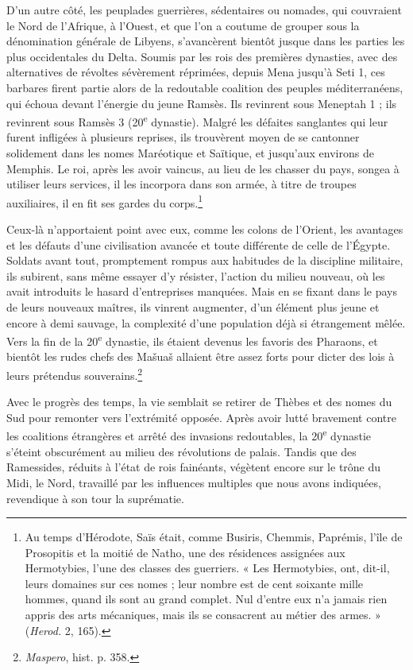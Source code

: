 \documentclass[a4paper, 11pt, oneside]{article}
\begin{document}
D'un autre côté, les peuplades guerrières, sédentaires ou nomades, qui couvraient le Nord de l'Afrique, à l'Ouest, et que l'on a coutume de grouper sous la dénomination générale de Libyens, s'avancèrent bientôt jusque dans les parties les plus occidentales du Delta. Soumis par les rois des premières dynasties, avec des alternatives de révoltes sévèrement réprimées, depuis Mena jusqu'à Seti 1, ces barbares firent partie alors de la redoutable coalition des peuples méditerranéens, qui échoua devant l'énergie du jeune Ramsès. Ils revinrent sous Meneptah 1 ; ils revinrent sous Ramsès 3 (20\textsuperscript{e} dynastie). Malgré les défaites sanglantes qui leur furent infligées à plusieurs reprises, ils trouvèrent moyen de se cantonner solidement dans les nomes Maréotique et Saïtique, et jusqu'aux environs de Memphis. Le roi, après les avoir vaincus, au lieu de les chasser du pays, songea à utiliser leurs services, il les incorpora dans son armée, à titre de troupes auxiliaires, il en fit ses gardes du corps.\footnote{Au temps d'Hérodote, Saïs était, comme Busiris, Chemmis, Paprémis, l'île de Prosopitis et la moitié de Natho, une des résidences assignées aux Hermotybies, l'une des classes des guerriers. « Les Hermotybies, ont, dit-il, leurs domaines sur ces nomes ; leur nombre est de cent soixante mille hommes, quand ils sont au grand complet. Nul d'entre eux n'a jamais rien appris des arts mécaniques, mais ils se consacrent au métier des armes. » (\emph{Herod.} 2, 165).}

Ceux-là n'apportaient point avec eux, comme les colons de l'Orient, les avantages et les défauts d'une civilisation avancée et toute différente de celle de l'Égypte. Soldats avant tout, promptement rompus aux habitudes de la discipline militaire, ils subirent, sans même essayer d'y résister, l'action du milieu nouveau, où les avait introduits le hasard d'entreprises manquées. Mais en se fixant dans le pays de leurs nouveaux maîtres, ils vinrent augmenter, d'un élément plus jeune et encore à demi sauvage, la complexité d'une population déjà si étrangement mêlée. Vers la fin de la 20\textsuperscript{e} dynastie, ils étaient devenus les favoris des Pharaons, et bientôt les rudes chefs des Mašuaš allaient être assez forts pour dicter des lois à leurs prétendus souverains.\footnote{\emph{Maspero}, hist. p. 358.}

Avec le progrès des temps, la vie semblait se retirer de Thèbes et des nomes du Sud pour remonter vers l'extrémité opposée. Après avoir lutté bravement contre les coalitions étrangères et arrêté des invasions redoutables, la 20\textsuperscript{e} dynastie s'éteint obscurément au milieu des révolutions de palais. Tandis que des Ramessides, réduits à l'état de rois fainéants, végètent encore sur le trône du Midi, le Nord, travaillé par les influences multiples que nous avons indiquées, revendique à son tour la suprématie.
\end{document}
